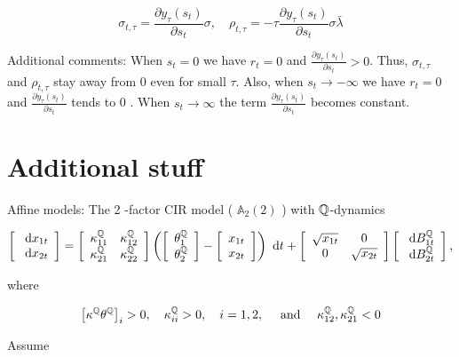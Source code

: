 $$
\sigma_{t, \tau}=\frac{\partial y_{\tau}\left(s_{t}\right)}{\partial s_{t}} \sigma, \quad \rho_{t, \tau}=-\tau \frac{\partial y_{\tau}\left(s_{t}\right)}{\partial s_{t}} \sigma \bar{\lambda}
$$

Additional comments: When $s_{t}=0$ we have $r_{t}=0$ and $\frac{\partial y_{\tau}\left(s_{t}\right)}{\partial s_{t}}>0$. Thus, $\sigma_{t, \tau}$ and $\rho_{t, \tau}$ stay away from 0 even for small $\tau$. Also, when $s_{t} \rightarrow-\infty$ we have $r_{t}=0$ and $\frac{\partial y_{\tau}\left(s_{t}\right)}{\partial s_{t}}$ tends to 0 . When $s_{t} \rightarrow \infty$ the term $\frac{\partial y_{\tau}\left(s_{t}\right)}{\partial s_{t}}$ becomes constant.

\section{Additional stuff}
Affine models: The 2 -factor CIR model ( $\mathbb{A}_{2}(2)$ ) with $\mathbb{Q}$-dynamics

$$
\left[\begin{array}{l}
\text{ d}  x_{1 t} \\
\text{ d}  x_{2 t}
\end{array}\right]=\left[\begin{array}{ll}
\kappa_{11}^{\mathbb{Q}} & \kappa_{12}^{\mathbb{Q}} \\
\kappa_{21}^{\mathbb{Q}} & \kappa_{22}^{\mathbb{Q}}
\end{array}\right]\left(\left[\begin{array}{l}
\theta_{1}^{\mathbb{Q}} \\
\theta_{2}^{\mathbb{Q}}
\end{array}\right]-\left[\begin{array}{l}
x_{1 t} \\
x_{2 t}
\end{array}\right]\right) \text{ d}  t+\left[\begin{array}{cc}
\sqrt{x_{1 t}} & 0 \\
0 & \sqrt{x_{2 t}}
\end{array}\right]\left[\begin{array}{l}
\text{ d}  B_{1 t}^{\mathbb{Q}} \\
\text{ d}  B_{2 t}^{\mathbb{Q}}
\end{array}\right],
$$

where

$$
\left[\kappa^{\mathbb{Q}} \theta^{\mathbb{Q}}\right]_{i}>0, \quad \kappa_{i i}^{\mathbb{Q}}>0, \quad i=1,2, \quad \text { and } \quad \kappa_{12}^{\mathbb{Q}}, \kappa_{21}^{\mathbb{Q}}<0
$$

Assume

